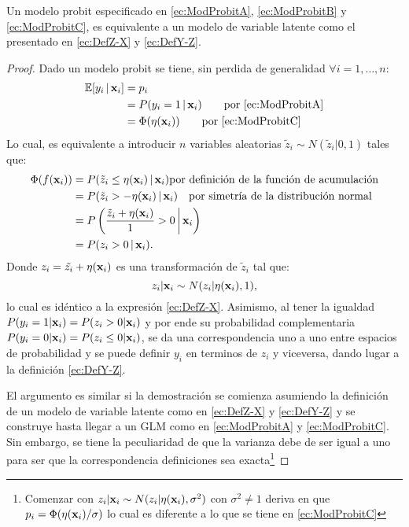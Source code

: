 \documentclass[../Main/Main.tex]{subfiles}
\begin{document}
\begin{theorem} \label{teo:Defs}
Un modelo probit especificado en \eqref{ec:ModProbitA}, \eqref{ec:ModProbitB} y \eqref{ec:ModProbitC}, es equivalente a un modelo de variable latente como el presentado en \eqref{ec:DefZ-X} y \eqref{ec:DefY-Z}.
\end{theorem}

\begin{proof} Dado un modelo probit se tiene, sin perdida de generalidad $\forall i = 1,\ldots,n$:
\begin{align*}
	\mathbb{E}[y_i\,|\,\mathbf{x}_i] &= p_i  \\
				&= P(y_i = 1\,|\,\mathbf{x}_i)  \qquad \text{por \eqref{ec:ModProbitA}}\\
				&= \Phi(\eta(\mathbf{x}_i)) \qquad \text{por \eqref{ec:ModProbitC}}
\end{align*}
Lo cual, es equivalente a introducir $n$ variables aleatorias $\tilde{z}_i \sim N(\tilde{z}_i|0,1)$ tales que:
\begin{align*}
	\Phi(f(\mathbf{x}_i)) 	&= P(\tilde{z}_i \leq \eta(\mathbf{x}_i)\,|\,\mathbf{x}_i)
				\text{por definición de la función de acumulación}\\
			      	&= P(\tilde{z}_i > - \eta(\mathbf{x}_i)\,|\,\mathbf{x}_i) \quad \text{por simetría de la distribución normal}\\
			      	&= P\left(\dfrac{\tilde{z}_i + \eta(\mathbf{x}_i)}{1} > 0\,\bigg|\,\mathbf{x}_i\right)\\
			      	&= P(z_i > 0\,|\,\mathbf{x}_i).
\end{align*}
Donde $z_i = \tilde{z_i} + \eta(\mathbf{x}_i)$ es una transformación de $\tilde{z}_i$ tal que: 
$$z_i|\mathbf{x}_i \sim N(z_i|\eta(\mathbf{x}_i),1),$$ 
lo cual es idéntico a la expresión \eqref{ec:DefZ-X}. Asimismo, al tener la igualdad $P(y_i = 1|\mathbf{x}_i) = P(z_i > 0|\mathbf{x}_i)$ y por ende su probabilidad complementaria $P(y_i = 0|\mathbf{x}_i) = P(z_i \leq 0|\mathbf{x}_i)$, se da una correspondencia uno a uno entre espacios de probabilidad y se puede definir $y_i$ en terminos de $z_i$ y viceversa, dando lugar a la definición \eqref{ec:DefY-Z}. 

El argumento es similar si la demostración se comienza asumiendo la definición de un modelo de variable latente como en \eqref{ec:DefZ-X} y \eqref{ec:DefY-Z} y se construye hasta llegar a un GLM como en  \eqref{ec:ModProbitA} y \eqref{ec:ModProbitC}. Sin embargo, se tiene la peculiaridad de que la varianza debe de ser igual a uno para ser que la correspondencia definiciones sea exacta\footnote{Comenzar con $z_i|\mathbf{x}_i \sim N(z_i|\eta(\mathbf{x}_i),\sigma^2)$ con $\sigma^2\neq 1$ deriva en que $p_i = \Phi(\eta(\mathbf{x}_i)/\sigma)$ lo cual es diferente a lo que se tiene en \eqref{ec:ModProbitC}}
\end{proof}
\end{document}
